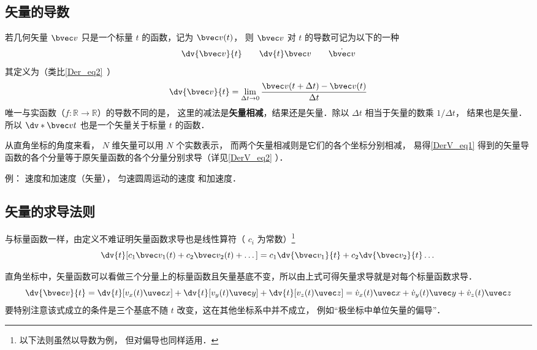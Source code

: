 

\subsection{矢量的导数}

若几何矢量 $\bvec v$ 只是一个标量 $t$ 的函数，记为 $\bvec v(t)$， 则 $\bvec v$ 对 $t$ 的导数可记为以下的一种
\begin{equation}
\dv{\bvec v}{t} \qquad \dv{t}\bvec v \qquad \dot{\bvec v}
\end{equation}
其定义为（类比\autoref{Der_eq2}~）
\begin{equation}\label{DerV_eq1}
\dv{\bvec v}{t} = \lim_{\Delta t \to 0} \frac{\bvec v ( t + \Delta t) - \bvec v(t)}{\Delta t}
\end{equation}
唯一与实函数（$f:\mathbb R \to \mathbb R$）的导数不同的是， 这里的减法是\textbf{矢量相减}，结果还是矢量．除以 $\Delta t$ 相当于矢量的数乘 $1/\Delta t$， 结果也是矢量． 所以 $\dv*{\bvec v}{t}$ 也是一个矢量关于标量 $t$ 的函数．

从直角坐标的角度来看， $N$ 维矢量可以用 $N$ 个实数表示， 而两个矢量相减则是它们的各个坐标分别相减， 易得\autoref{DerV_eq1} 得到的矢量导函数的各个分量等于原矢量函数的各个分量分别求导（详见\autoref{DerV_eq2} ）．

例： 速度和加速度（矢量）， 匀速圆周运动的速度 和加速度．

\subsection{矢量的求导法则}
与标量函数一样，由定义不难证明矢量函数求导也是线性算符（ $c_i$ 为常数）\footnote{以下法则虽然以导数为例， 但对偏导也同样适用．}
\begin{equation}
\dv{t}[c_1 \bvec v_1(t) + c_2 \bvec v_2(t) + \dots] = c_1\dv{\bvec v_1}{t} + c_2\dv{\bvec v_2}{t} \dots
\end{equation}

直角坐标中，矢量函数可以看做三个分量上的标量函数且矢量基底不变，所以由上式可得矢量求导就是对每个标量函数求导．
\begin{equation}\label{DerV_eq2}
\dv{\bvec v}{t} = \dv{t}[v_x(t)\uvec x] + \dv{t}[v_y(t)\uvec y] + \dv{t}[v_z(t)\uvec z]
= \dot v_x(t)\uvec x + \dot v_y(t)\uvec y + \dot v_z(t)\uvec z
\end{equation}
要特别注意该式成立的条件是三个基底不随 $t$ 改变，这在其他坐标系中并不成立， 例如“极坐标中单位矢量的偏导”．

